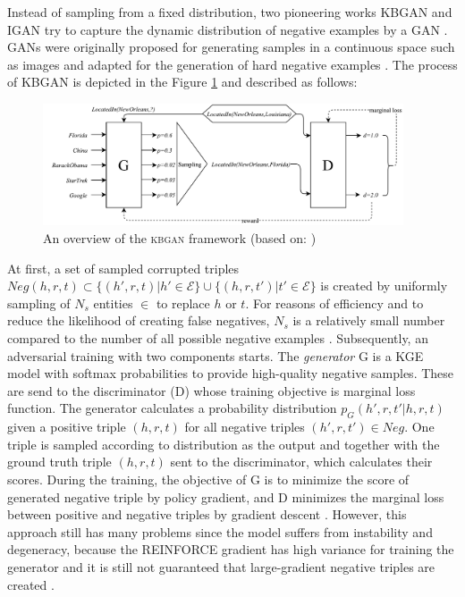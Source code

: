 Instead of sampling from a fixed distribution, two pioneering works \ac{KBGAN} \cite{cai2017kbgan} and \ac{IGAN} \cite{IGAN} try to capture the dynamic distribution of negative examples by a \ac{GAN} \cite{zhang2021efficient}.
\acp{GAN} were originally proposed for generating samples in a continuous space such as images and adapted for the generation of hard negative examples \cite{zhang2021efficient}.
The process of \ac{KBGAN} is depicted in the Figure \ref{fig:overview} and described as follows:
\begin{figure}[t]
  \centering
    \includegraphics[width=0.95\textwidth]{figures/kbgan_overview.pdf}
  \caption{An overview of the \textsc{kbgan} framework (based on: \cite{cai2017kbgan})}
  \label{fig:overview}
\end{figure}
At first, a set of sampled corrupted triples $Neg(h,r,t)\subset\{(h',r,t)|h'\in\mathcal{E}\}\cup\{(h,r,t')|t'\in\mathcal{E}\}$ is created by uniformly sampling of $N_s$ entities $\in$ \entities to replace $h$ or $t$.
For reasons of efficiency and to reduce the likelihood of creating false negatives, $N_s$ is a relatively small number compared to the number of all possible negative examples \cite{cai2017kbgan}.
Subsequently, an adversarial training with two components starts.
The \textit{generator} G is a \ac{KGE} model with softmax probabilities to provide high-quality negative samples.
These are send to the discriminator (D) whose training objective is marginal loss function.
The generator calculates a probability distribution $p_G(h',r,t'|h,r,t)$ given a positive triple $(h,r,t)$ for all negative triples $(h', r, t') \in Neg$.
One triple is sampled according to distribution as the output and together with the ground truth triple $(h,r,t)$ sent to the discriminator, which calculates their scores. 
During the training, the objective of G is to minimize the score of generated negative triple by policy gradient, and D minimizes the marginal loss between positive and negative triples by gradient descent \cite{cai2017kbgan}.
However, this approach still has many problems since the model suffers from instability and degeneracy, because the \textsc{REINFORCE} gradient has high variance for training the generator and it is still not guaranteed that large-gradient negative triples are created \cite{zhang2021efficient}.

